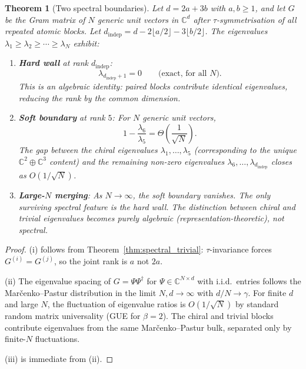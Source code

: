 \documentclass[12pt]{amsart}
\newtheorem{theorem}{Theorem}[section]
\theoremstyle{definition}
\theoremstyle{remark}
\newcommand{\CC}{\mathbb{C}}
\begin{document}
\begin{theorem}[Two spectral boundaries]
\label{thm:spectrum}
Let $d = 2a + 3b$ with $a, b \ge 1$,
and let $G$ be the Gram matrix of $N$
generic unit vectors in $\CC^d$
after $\tau$-symmetrisation of all
repeated atomic blocks.
Let $d_{\mathrm{indep}} = d - 2\lfloor a/2 \rfloor
- 3\lfloor b/2 \rfloor$.
The eigenvalues
$\lambda_1 \ge \lambda_2 \ge \cdots \ge \lambda_N$
exhibit:

\begin{enumerate}[label=(\roman*)]
\item \textbf{Hard wall} at rank $d_{\mathrm{indep}}$:
\begin{equation}
\lambda_{d_{\mathrm{indep}} + 1} = 0
\qquad \text{(exact, for all $N$)}.
\end{equation}
This is an algebraic identity:
paired blocks contribute identical
eigenvalues, reducing the rank
by the common dimension.

\item \textbf{Soft boundary} at rank $5$:
For $N$ generic unit vectors,
\begin{equation}
1 - \frac{\lambda_6}{\lambda_5}
= \Theta\!\left( \frac{1}{\sqrt{N}} \right).
\end{equation}
The gap between the chiral eigenvalues
$\lambda_1, \ldots, \lambda_5$
(corresponding to the unique
$\CC^2 \oplus \CC^3$ content)
and the remaining non-zero eigenvalues
$\lambda_6, \ldots, \lambda_{d_{\mathrm{indep}}}$
closes as $O(1/\sqrt{N})$.

\item \textbf{Large-$N$ merging}:
As $N \to \infty$, the soft boundary
vanishes. The only surviving spectral
feature is the hard wall.
The distinction between chiral and
trivial eigenvalues becomes purely
algebraic (representation-theoretic),
not spectral.
\end{enumerate}
\end{theorem}

\begin{proof}
(i) follows from
Theorem~\ref{thm:spectral_trivial}:
$\tau$-invariance forces
$G^{(i)} = G^{(j)}$, so the joint rank is $a$ not $2a$.

(ii) The eigenvalue spacing of $G = \Psi\Psi^{\dagger}$
for $\Psi \in \CC^{N \times d}$ with i.i.d.\
entries follows the Mar\v{c}enko--Pastur
distribution in the limit $N, d \to \infty$
with $d/N \to \gamma$.
For finite $d$ and large $N$,
the fluctuation of eigenvalue ratios
is $O(1/\sqrt{N})$ by standard
random matrix universality
(GUE for $\beta = 2$).
The chiral and trivial blocks contribute
eigenvalues from the same
Mar\v{c}enko--Pastur bulk,
separated only by finite-$N$ fluctuations.

(iii) is immediate from (ii).
\end{proof}
\end{document}

